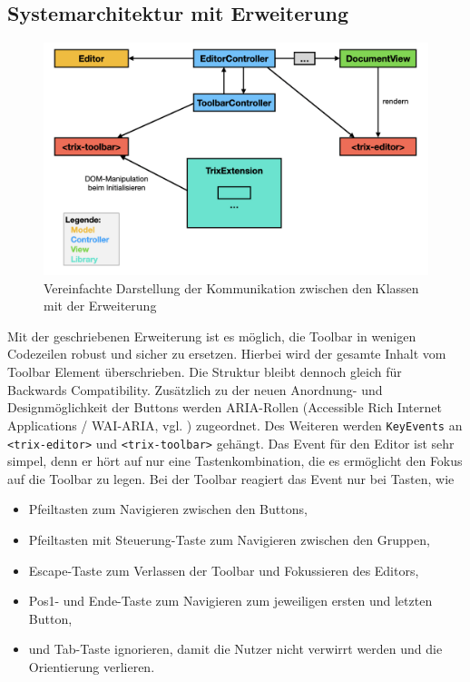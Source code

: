 \subsection{Systemarchitektur mit Erweiterung}

\begin{figure}[H]
\begin{center}
	\includegraphics[scale=.4]{images/sysarch_extension.png}
\end{center}
	\caption{Vereinfachte Darstellung der Kommunikation zwischen den Klassen mit der Erweiterung}
\end{figure}

Mit der geschriebenen Erweiterung ist es möglich, die Toolbar in wenigen Codezeilen robust und sicher zu ersetzen. Hierbei wird der gesamte Inhalt vom Toolbar Element überschrieben. Die Struktur bleibt dennoch gleich für Backwards Compatibility. Zusätzlich zu der neuen Anordnung- und Designmöglichkeit der Buttons werden ARIA-Rollen (Accessible Rich Internet Applications / WAI-ARIA, vgl. \cite{wai_aria_2017}) zugeordnet. Des Weiteren werden \texttt{KeyEvents} an \texttt{<trix-editor>} und \texttt{<trix-toolbar>} gehängt. Das Event für den Editor ist sehr simpel, denn er hört auf nur eine Tastenkombination, die es ermöglicht den Fokus auf die Toolbar zu legen. Bei der Toolbar reagiert das Event nur bei Tasten, wie

\begin{itemize}
	\item Pfeiltasten zum Navigieren zwischen den Buttons,
	\item Pfeiltasten mit Steuerung-Taste zum Navigieren zwischen den Gruppen,
	\item Escape-Taste zum Verlassen der Toolbar und Fokussieren des Editors,
	\item Pos1- und Ende-Taste zum Navigieren zum jeweiligen ersten und letzten Button,
	\item und Tab-Taste ignorieren, damit die Nutzer nicht verwirrt werden und die Orientierung verlieren.
\end{itemize}

